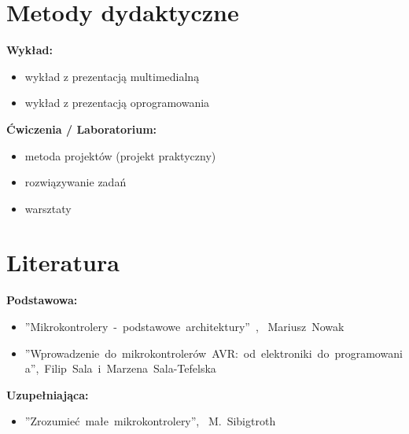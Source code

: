 \documentclass[12pt, a4paper]{article}
\begin{document}
\section{Metody dydaktyczne}

\textbf{Wykład:}
\begin{itemize}
  \item wykład z prezentacją multimedialną
  \item wykład z prezentacją oprogramowania
\end{itemize}
\vspace{4pt}
\textbf{Ćwiczenia / Laboratorium:}
\begin{itemize}
  \item metoda projektów (projekt praktyczny)
  \item rozwiązywanie zadań
  \item warsztaty
\end{itemize}
\vspace{4pt}


\section{Literatura}

\textbf{Podstawowa:}
\begin{itemize}
  \item ''Mikrokontrolery - podstawowe architektury'' ,  Mariusz Nowak
  \item ''Wprowadzenie do mikrokontrolerów AVR: od elektroniki do programowania'', Filip Sala i Marzena Sala-Tefelska
\end{itemize}

\textbf{Uzupełniająca:}
\begin{itemize}
  \item ''Zrozumieć małe mikrokontrolery'',  M. Sibigtroth
\end{itemize}
\end{document}
